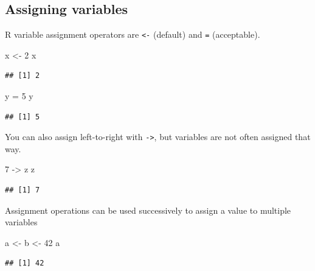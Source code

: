 \documentclass[]{book}
\newenvironment{Shaded}{\begin{snugshade}}{\end{snugshade}}
\newcommand{\DecValTok}[1]{\textcolor[rgb]{0.00,0.00,0.81}{#1}}
\newcommand{\NormalTok}[1]{#1}
\newcommand{\StringTok}[1]{\textcolor[rgb]{0.31,0.60,0.02}{#1}}
\theoremstyle{definition}
\theoremstyle{definition}
\theoremstyle{definition}
\theoremstyle{remark}
\begin{document}
\hypertarget{assigning-variables}{%
\subsection{Assigning variables}\label{assigning-variables}}

R variable assignment operators are \texttt{\textless{}-} (default) and
\texttt{=} (acceptable).

\begin{Shaded}
\begin{Highlighting}[]
\NormalTok{x <-}\StringTok{ }\DecValTok{2}
\NormalTok{x}
\end{Highlighting}
\end{Shaded}

\begin{verbatim}
## [1] 2
\end{verbatim}

\begin{Shaded}
\begin{Highlighting}[]
\NormalTok{y =}\StringTok{ }\DecValTok{5}
\NormalTok{y}
\end{Highlighting}
\end{Shaded}

\begin{verbatim}
## [1] 5
\end{verbatim}

You can also assign left-to-right with \texttt{-\textgreater{}}, but
variables are not often assigned that way.

\begin{Shaded}
\begin{Highlighting}[]
\DecValTok{7}\NormalTok{ ->}\StringTok{ }\NormalTok{z}
\NormalTok{z}
\end{Highlighting}
\end{Shaded}

\begin{verbatim}
## [1] 7
\end{verbatim}

Assignment operations can be used successively to assign a value to
multiple variables

\begin{Shaded}
\begin{Highlighting}[]
\NormalTok{a <-}\StringTok{ }\NormalTok{b <-}\StringTok{ }\DecValTok{42}
\NormalTok{a}
\end{Highlighting}
\end{Shaded}

\begin{verbatim}
## [1] 42
\end{verbatim}
\end{document}
